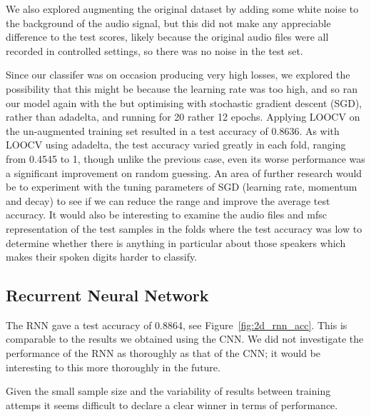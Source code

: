 We also explored augmenting the original dataset by adding some white noise to the background of the audio signal, but this did not make any appreciable difference to the test scores, likely because the original audio files were all recorded in controlled settings, so there was no noise in the test set.

Since our classifer was on occasion producing very high losses, we explored the possibility that this might be because the learning rate was too high, and so ran our model again with the but optimising with stochastic gradient descent (SGD), rather than adadelta, and running for 20 rather 12 epochs. Applying LOOCV on the un-augmented training set resulted in a test accuracy of 0.8636. As with LOOCV using adadelta, the test accuracy varied greatly in each fold, ranging from 0.4545 to 1, though unlike the previous case, even its worse performance was a significant improvement on random guessing. An area of further research would be to experiment with the tuning parameters of SGD (learning rate, momentum and decay) to see if we can reduce the range and improve the average test accuracy. It would also be interesting to examine the audio files and mfsc representation of the test samples in the folds where the test accuracy was low to determine whether there is anything in particular about those speakers which makes their spoken digits harder to classify. 

\subsection{Recurrent Neural Network}

The RNN gave a test accuracy of 0.8864, see Figure~\ref{fig:2d_rnn_acc}. This is comparable to the results we obtained using the CNN. We did not investigate the performance of the RNN as thoroughly as that of the CNN; it would be interesting to this more thoroughly in the future.

Given the small sample size and the variability of results between training attemps it seems difficult to declare a clear winner in terms of performance.

